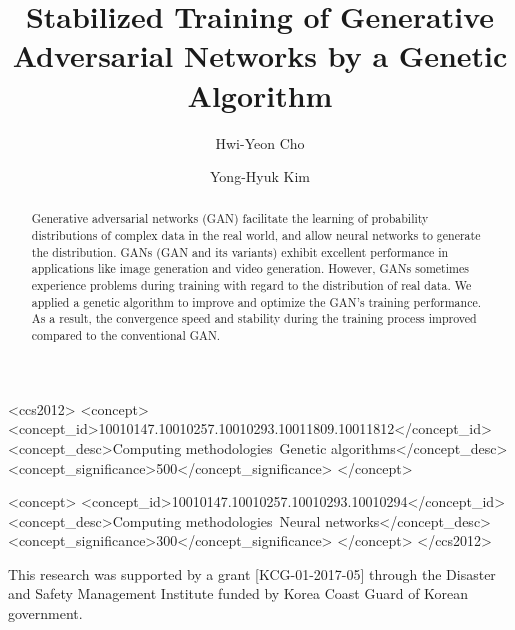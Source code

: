 \documentclass[sigconf]{acmart}
\begin{document}
\title{Stabilized Training of Generative Adversarial Networks by a Genetic Algorithm}


\author{Hwi-Yeon Cho}

\author{Yong-Hyuk Kim}

\renewcommand{\shortauthors}{H.-Y. Cho et al.}


\begin{abstract}
Generative adversarial networks (GAN) facilitate the learning of probability distributions of complex data in the real world, and allow neural networks to generate the distribution. GANs (GAN and its variants) exhibit excellent performance in applications like image generation and video generation. However, GANs sometimes experience problems during training with regard to the distribution of real data. We applied a genetic algorithm to improve and optimize the GAN’s training performance. As a result, the convergence speed and stability during the training process improved compared to the conventional GAN.
\end{abstract}


%
%
\begin{CCSXML}
<ccs2012>
  <concept>
    <concept_id>10010147.10010257.10010293.10011809.10011812</concept_id>
    <concept_desc>Computing methodologies~Genetic algorithms</concept_desc>
    <concept_significance>500</concept_significance>
  </concept>

  <concept>
    <concept_id>10010147.10010257.10010293.10010294</concept_id>
    <concept_desc>Computing methodologies~Neural networks</concept_desc>
    <concept_significance>300</concept_significance>
  </concept>
</ccs2012>
\end{CCSXML}





\maketitle





\begin{acks}
\footnotesize
This research was supported by a grant [KCG-01-2017-05] through the Disaster and Safety Management Institute funded by Korea Coast Guard of Korean government.
\par
\end{acks}




\end{document}
